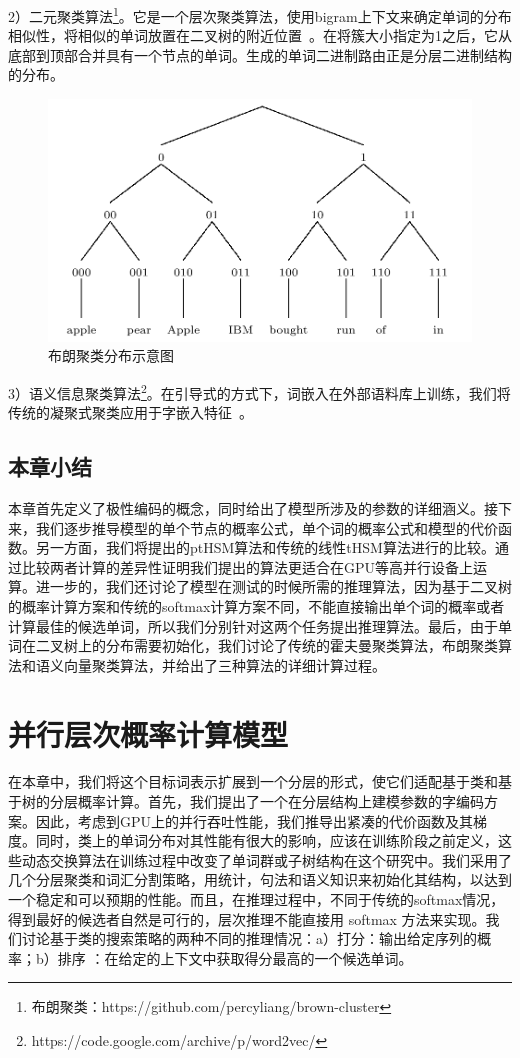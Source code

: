 2）二元聚类算法\footnote{布朗聚类：https://github.com/percyliang/brown-cluster}。它是一个层次聚类算法，使用bigram上下文来确定单词的分布相似性，将相似的单词放置在二叉树的附近位置~。在将簇大小指定为1之后，它从底部到顶部合并具有一个节点的单词。生成的单词二进制路由正是分层二进制结构的分布。
\begin{figure}[!ht]
  \centering
\includegraphics[width=0.6\linewidth]{./figures/brown.png}
\caption{布朗聚类分布示意图}\label{fig:brown}
\end{figure}

3）语义信息聚类算法\footnote{https://code.google.com/archive/p/word2vec/}。在引导式的方式下，词嵌入在外部语料库上训练，我们将传统的凝聚式聚类应用于字嵌入特征~。


\section{本章小结}
本章首先定义了极性编码的概念，同时给出了模型所涉及的参数的详细涵义。接下来，我们逐步推导模型的单个节点的概率公式，单个词的概率公式和模型的代价函数。另一方面，我们将提出的ptHSM算法和传统的线性tHSM算法进行的比较。通过比较两者计算的差异性证明我们提出的算法更适合在GPU等高并行设备上运算。进一步的，我们还讨论了模型在测试的时候所需的推理算法，因为基于二叉树的概率计算方案和传统的softmax计算方案不同，不能直接输出单个词的概率或者计算最佳的候选单词，所以我们分别针对这两个任务提出推理算法。最后，由于单词在二叉树上的分布需要初始化，我们讨论了传统的霍夫曼聚类算法，布朗聚类算法和语义向量聚类算法，并给出了三种算法的详细计算过程。

\chapter{并行层次概率计算模型}
在本章中，我们将这个目标词表示扩展到一个分层的形式，使它们适配基于类和基于树的分层概率计算。首先，我们提出了一个在分层结构上建模参数的字编码方案。因此，考虑到GPU上的并行吞吐性能，我们推导出紧凑的代价函数及其梯度。同时，类上的单词分布对其性能有很大的影响，应该在训练阶段之前定义，这些动态交换算法在训练过程中改变了单词群或子树结构在这个研究中。我们采用了几个分层聚类和词汇分割策略，用统计，句法和语义知识来初始化其结构，以达到一个稳定和可以预期的性能。而且，在推理过程中，不同于传统的softmax情况，得到最好的候选者自然是可行的，层次推理不能直接用 softmax 方法来实现。我们讨论基于类的搜索策略的两种不同的推理情况：a）打分：输出给定序列的概率；b）排序   ：在给定的上下文中获取得分最高的一个候选单词。
